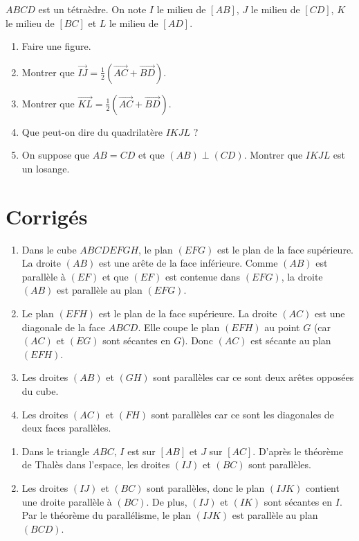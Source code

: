 $ABCD$ est un tétraèdre. On note $I$ le milieu de $[AB]$, $J$ le milieu de $[CD]$, $K$ le milieu de $[BC]$ et $L$ le milieu de $[AD]$.
\begin{enumerate}[label=\arabic*)]
\item Faire une figure.
\item Montrer que $\overrightarrow{IJ} = \frac{1}{2}(\overrightarrow{AC} + \overrightarrow{BD})$.
\item Montrer que $\overrightarrow{KL} = \frac{1}{2}(\overrightarrow{AC} + \overrightarrow{BD})$.
\item Que peut-on dire du quadrilatère $IKJL$ ?
\item On suppose que $AB = CD$ et que $(AB) \perp (CD)$. Montrer que $IKJL$ est un losange.
\end{enumerate}

\section{Corrigés}

\begin{enumerate}[label=\alph*)]
\item Dans le cube $ABCDEFGH$, le plan $(EFG)$ est le plan de la face supérieure. La droite $(AB)$ est une arête de la face inférieure. Comme $(AB)$ est parallèle à $(EF)$ et que $(EF)$ est contenue dans $(EFG)$, la droite $(AB)$ est parallèle au plan $(EFG)$.
\item Le plan $(EFH)$ est le plan de la face supérieure. La droite $(AC)$ est une diagonale de la face $ABCD$. Elle coupe le plan $(EFH)$ au point $G$ (car $(AC)$ et $(EG)$ sont sécantes en $G$). Donc $(AC)$ est sécante au plan $(EFH)$.
\item Les droites $(AB)$ et $(GH)$ sont parallèles car ce sont deux arêtes opposées du cube.
\item Les droites $(AC)$ et $(FH)$ sont parallèles car ce sont les diagonales de deux faces parallèles.
\end{enumerate}

\begin{enumerate}[label=\alph*)]
\item Dans le triangle $ABC$, $I$ est sur $[AB]$ et $J$ sur $[AC]$. D'après le théorème de Thalès dans l'espace, les droites $(IJ)$ et $(BC)$ sont parallèles.
\item Les droites $(IJ)$ et $(BC)$ sont parallèles, donc le plan $(IJK)$ contient une droite parallèle à $(BC)$. De plus, $(IJ)$ et $(IK)$ sont sécantes en $I$. Par le théorème du parallélisme, le plan $(IJK)$ est parallèle au plan $(BCD)$.
\end{enumerate}

